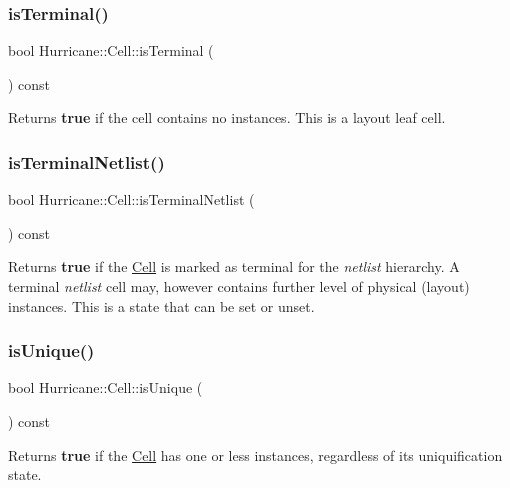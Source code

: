 \subsubsection{\texorpdfstring{is\+Terminal()}{isTerminal()}}
{\footnotesize\ttfamily bool Hurricane\+::\+Cell\+::is\+Terminal (\begin{DoxyParamCaption}{ }\end{DoxyParamCaption}) const\hspace{0.3cm}{\ttfamily [inline]}}

Returns {\bfseries true} if the cell contains no instances. This is a layout leaf cell. \mbox{\label{classHurricane_1_1Cell_a6fe2b5a80d4b344733416b25ea559497}} 
\subsubsection{\texorpdfstring{is\+Terminal\+Netlist()}{isTerminalNetlist()}}
{\footnotesize\ttfamily bool Hurricane\+::\+Cell\+::is\+Terminal\+Netlist (\begin{DoxyParamCaption}{ }\end{DoxyParamCaption}) const\hspace{0.3cm}{\ttfamily [inline]}}

Returns {\bfseries true} if the \mbox{\hyperlink{classHurricane_1_1Cell}{Cell}} is marked as terminal for the {\itshape netlist} hierarchy. A terminal {\itshape netlist} cell may, however contains further level of physical (layout) instances. This is a state that can be set or unset. \mbox{\label{classHurricane_1_1Cell_a6c2f2fd9f6f6e0578937a90c0c37a507}} 
\subsubsection{\texorpdfstring{is\+Unique()}{isUnique()}}
{\footnotesize\ttfamily bool Hurricane\+::\+Cell\+::is\+Unique (\begin{DoxyParamCaption}{ }\end{DoxyParamCaption}) const}

Returns {\bfseries true} if the \mbox{\hyperlink{classHurricane_1_1Cell}{Cell}} has one or less instances, regardless of it\textquotesingle{}s uniquification state. \mbox{\label{classHurricane_1_1Cell_a86c21867e9ce896eae72fd2999ce8a2d}} 
